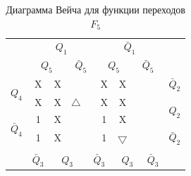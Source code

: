 \documentclass[a4paper,14pt]{article}
\begin{document}
\begin{table}[H]
	\begin{center}
		\caption{\label{tab:F5_tab} Диаграмма Вейча для функции переходов $F_5$ }
\begin{tabular}{cccccccccc}
	& \multicolumn{4}{c}{$Q_1$} & \multicolumn{4}{c}{$\bar{Q}_1$} &  \\
	& \multicolumn{2}{c}{$Q_5$} & \multicolumn{2}{c}{$\bar{Q}_5$} & \multicolumn{2}{c}{$Q_5$} & \multicolumn{2}{c}{$\bar{Q}_5$} &  \\ \cline{2-9}
	\multicolumn{1}{c|}{\multirow{2}{*}{$Q_4$}} & \multicolumn{1}{c|}{X} & \multicolumn{1}{c|}{X} & \multicolumn{1}{c|}{} & \multicolumn{1}{c|}{} & \multicolumn{1}{c|}{X} & \multicolumn{1}{c|}{X} & \multicolumn{1}{c|}{} & \multicolumn{1}{c|}{} & $\bar{Q}_2$ \\ \cline{2-9}
	\multicolumn{1}{c|}{} & \multicolumn{1}{c|}{X} & \multicolumn{1}{c|}{X} & \multicolumn{1}{c|}{$\bigtriangleup$} & \multicolumn{1}{c|}{} & \multicolumn{1}{c|}{X} & \multicolumn{1}{c|}{X} & \multicolumn{1}{c|}{} & \multicolumn{1}{c|}{} & \multirow{2}{*}{$Q_2$} \\ \cline{2-9}
	\multicolumn{1}{c|}{\multirow{2}{*}{$\bar{Q}_4$}} & \multicolumn{1}{c|}{1} & \multicolumn{1}{c|}{X} & \multicolumn{1}{c|}{} & \multicolumn{1}{c|}{} & \multicolumn{1}{c|}{1} & \multicolumn{1}{c|}{X} & \multicolumn{1}{c|}{} & \multicolumn{1}{c|}{} &  \\ \cline{2-9}
	\multicolumn{1}{c|}{} & \multicolumn{1}{c|}{1} & \multicolumn{1}{c|}{X} & \multicolumn{1}{c|}{} & \multicolumn{1}{c|}{} & \multicolumn{1}{c|}{1} & \multicolumn{1}{c|}{$\bigtriangledown$} & \multicolumn{1}{c|}{} & \multicolumn{1}{c|}{} & $\bar{Q}_2$ \\ \cline{2-9}
	&  & \multicolumn{2}{c}{} & \multicolumn{2}{c}{} & \multicolumn{2}{c}{} &  &  \\
	& $\bar{Q}_3$ & \multicolumn{2}{c}{$Q_3$} & \multicolumn{2}{c}{$\bar{Q}_3$} & \multicolumn{2}{c}{$Q_3$} & $\bar{Q}_3$ & 
\end{tabular}
\end{center}
\end{table}

\end{document}
